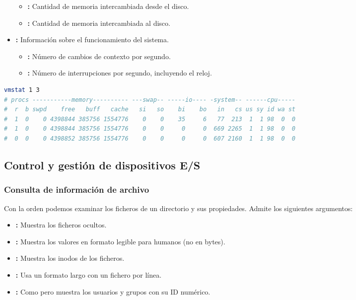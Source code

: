 \begin{itemize}
\begin{itemize}
		\item{}\textbf{:} Cantidad de memoria intercambiada desde el disco.
		\item{}\textbf{:} Cantidad de memoria intercambiada al disco.
	\end{itemize}
	\item{}\textbf{:} Información sobre el funcionamiento del sistema.
	\begin{itemize}
		\item{}\textbf{:} Número de cambios de contexto por segundo.
		\item{}\textbf{:} Número de interrupciones por segundo, incluyendo el reloj.
	\end{itemize}
\end{itemize}

\begin{lstlisting}[language=Bash]
vmstat 1 3
# procs -----------memory---------- ---swap-- -----io---- -system-- ------cpu-----
#  r  b swpd    free   buff   cache   si   so    bi    bo   in   cs us sy id wa st
#  1  0    0 4398844 385756 1554776    0    0    35     6   77  213  1  1 98  0  0
#  1  0    0 4398844 385756 1554776    0    0     0     0  669 2265  1  1 98  0  0
#  0  0    0 4398852 385756 1554776    0    0     0     0  607 2160  1  1 98  0  0
\end{lstlisting}

\subsection{Control y gestión de dispositivos E/S}

\subsubsection{Consulta de información de archivo}

Con la orden  podemos examinar los ficheros de un directorio y sus propiedades.
Admite los siguientes argumentos:

\begin{itemize}
	\item{}\textbf{:} Muestra los ficheros ocultos.
	\item{}\textbf{:} Muestra los valores en formato legible para humanos (no en bytes).
	\item{}\textbf{:} Muestra los inodos de los ficheros.
	\item{}\textbf{:} Usa un formato largo con un fichero por línea.
	\item{}\textbf{:} Como  pero muestra los usuarios y grupos con su ID numérico.
\end{itemize}

